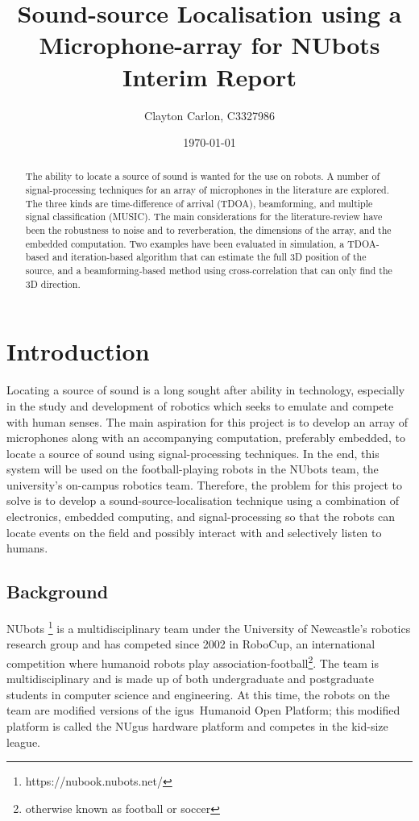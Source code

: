 \documentclass[notitlepage]{report}
\title{
	Sound-source Localisation using a Microphone-array for NUbots\\
	Interim Report
}
\author{Clayton Carlon, C3327986}
\date{\today}
\begin{document}
\maketitle
\begin{abstract}
The ability to locate a source of sound is wanted for the use on robots. A number of signal-processing techniques for an array of microphones in the literature are explored. The three kinds are time-difference of arrival (TDOA), beamforming, and multiple signal classification (MUSIC). The main considerations for the literature-review have been the robustness to noise and to reverberation, the dimensions of the array, and the embedded computation. Two examples have been evaluated in simulation, a TDOA-based and iteration-based algorithm that can estimate the full 3D position of the source, and a beamforming-based method using cross-correlation that can only find the 3D direction.
\end{abstract}

\tableofcontents

\chapter{Introduction}

Locating a source of sound is a long sought after ability in technology, especially in the study and development of robotics which seeks to emulate and compete with human senses. The main aspiration for this project is to develop an array of microphones along with an accompanying computation, preferably embedded, to locate a source of sound using signal-processing techniques. In the end, this system will be used on the football-playing robots in the NUbots team, the university's on-campus robotics team. Therefore, the problem for this project to solve is to develop a sound-source-localisation technique using a combination of electronics, embedded computing, and signal-processing so that the robots can locate events on the field and possibly interact with and selectively listen to humans.

\section{Background}

NUbots \footnote{https://nubook.nubots.net/} is a multidisciplinary team under the University of Newcastle's robotics research group and has competed since 2002 in RoboCup, an international competition where humanoid robots play association-football\footnote{otherwise known as football or soccer}. The team is multidisciplinary and is made up of both undergraduate and postgraduate students in computer science and engineering. At this time, the robots on the team are modified versions of the igus\textregistered\ Humanoid Open Platform; this modified platform is called the NUgus hardware platform and competes in the kid-size league.
\end{document}
